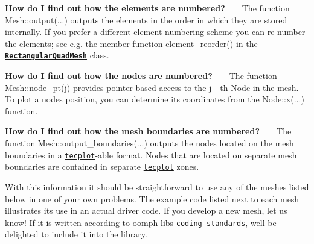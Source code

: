 \begin{DoxyItemize}
\item {\bfseries How do I find out how the elements are numbered?} ~\newline
~\newline
 The function {\ttfamily Mesh\+::output}(...) outputs the elements in the order in which they are stored internally. If you prefer a different element numbering scheme you can re-\/number the elements; see e.\+g. the member function {\ttfamily element\+\_\+reorder()} in the \href{classoomph_1_1RectangularQuadMesh.html}{\tt {\bfseries  Rectangular\+Quad\+Mesh}} class. ~\newline
~\newline

\item {\bfseries How do I find out how the nodes are numbered?} ~\newline
~\newline
 The function {\ttfamily Mesh\+::node\+\_\+pt(j)} provides pointer-\/based access to the {\ttfamily j} -\/ th {\ttfamily Node} in the mesh. To plot a node\textquotesingle{}s position, you can determine its coordinates from the {\ttfamily Node\+::x}(...) function. ~\newline
~\newline

\item {\bfseries How do I find out how the mesh boundaries are numbered?} ~\newline
~\newline
 The function {\ttfamily Mesh\+::output\+\_\+boundaries}(...) outputs the nodes located on the mesh boundaries in a \href{http://www.tecplot.com}{\tt tecplot}-\/able format. Nodes that are located on separate mesh boundaries are contained in separate \href{http://www.tecplot.com}{\tt tecplot} zones. ~\newline
~\newline

\end{DoxyItemize}With this information it should be straightforward to use any of the meshes listed below in one of your own problems. The example code listed next to each mesh illustrates its use in an actual driver code. If you develop a new mesh, let us know! If it is written according to {\ttfamily oomph-\/lib\textquotesingle{}s} \href{../../../coding_conventions/html/index.html}{\tt coding standards}, we\textquotesingle{}ll be delighted to include it into the library.



